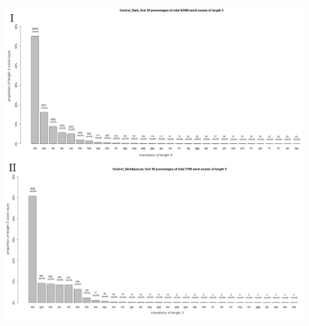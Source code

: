 \begin{figure}[h!]
\begin{center}
\includegraphics[width=15cm,height=17cm]{transitionsperboutlength1.png}
\end{center}
\end{figure}
